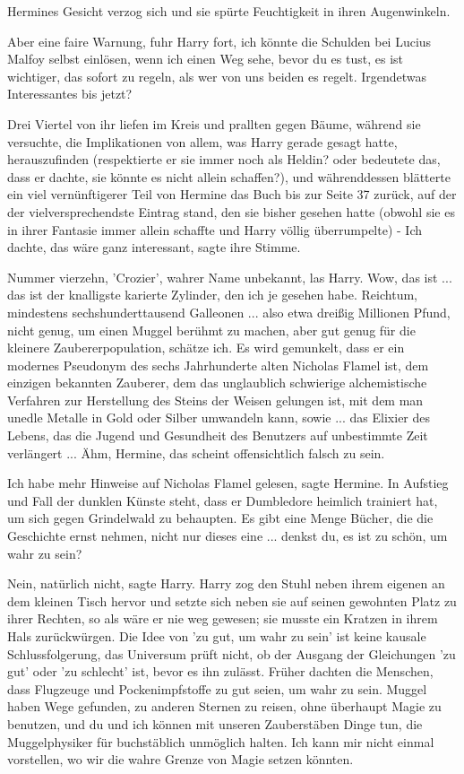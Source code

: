 Hermines Gesicht verzog sich und sie spürte Feuchtigkeit in ihren Augenwinkeln.

\glqq{}Aber eine faire Warnung\grqq{}, fuhr Harry fort, \glqq{}ich könnte die
Schulden bei Lucius Malfoy selbst einlösen, wenn ich einen Weg sehe, bevor du es
tust, es ist wichtiger, das sofort zu regeln, als wer von uns beiden es regelt.
Irgendetwas Interessantes bis jetzt?\grqq{}

Drei Viertel von ihr liefen im Kreis und prallten gegen Bäume, während sie
versuchte, die Implikationen von allem, was Harry gerade gesagt hatte,
herauszufinden (respektierte er sie immer noch als Heldin? oder bedeutete das,
dass er dachte, sie könnte es nicht allein schaffen?), und währenddessen
blätterte ein viel vernünftigerer Teil von Hermine das Buch bis zur Seite 37
zurück, auf der der vielversprechendste Eintrag stand, den sie bisher gesehen
hatte (obwohl sie es in ihrer Fantasie immer allein schaffte und Harry völlig
überrumpelte) - \glqq{}Ich dachte, das wäre ganz interessant\grqq{}, sagte ihre
Stimme.

\glqq{}Nummer vierzehn, 'Crozier', wahrer Name unbekannt\grqq{}, las Harry. \glqq{}
Wow, das ist ... das ist der knalligste karierte Zylinder, den ich je gesehen
habe. Reichtum, mindestens sechshunderttausend Galleonen ... also etwa dreißig
Millionen Pfund, nicht genug, um einen Muggel berühmt zu machen, aber gut genug
für die kleinere Zaubererpopulation, schätze ich. Es wird gemunkelt, dass er ein
modernes Pseudonym des sechs Jahrhunderte alten Nicholas Flamel ist, dem
einzigen bekannten Zauberer, dem das unglaublich schwierige alchemistische
Verfahren zur Herstellung des Steins der Weisen gelungen ist, mit dem man unedle
Metalle in Gold oder Silber umwandeln kann, sowie ... das Elixier des Lebens, das
die Jugend und Gesundheit des Benutzers auf unbestimmte Zeit verlängert ... Ähm,
Hermine, das scheint offensichtlich falsch zu sein.\grqq{}

\glqq{}Ich habe mehr Hinweise auf Nicholas Flamel gelesen\grqq{}, sagte Hermine.
\glqq{}In Aufstieg und Fall der dunklen Künste steht, dass er Dumbledore heimlich
trainiert hat, um sich gegen Grindelwald zu behaupten. Es gibt eine Menge
Bücher, die die Geschichte ernst nehmen, nicht nur dieses eine ... denkst du, es
ist zu schön, um wahr zu sein?\grqq{}

\glqq{}Nein, natürlich nicht\grqq{}, sagte Harry. Harry zog den Stuhl neben ihrem
eigenen an dem kleinen Tisch hervor und setzte sich neben sie auf seinen
gewohnten Platz zu ihrer Rechten, so als wäre er nie weg gewesen; sie musste ein
Kratzen in ihrem Hals zurückwürgen. \glqq{}Die Idee von 'zu gut, um wahr zu sein'
ist keine kausale Schlussfolgerung, das Universum prüft nicht, ob der Ausgang
der Gleichungen 'zu gut' oder 'zu schlecht' ist, bevor es ihn zulässt. Früher
dachten die Menschen, dass Flugzeuge und Pockenimpfstoffe zu gut seien, um wahr
zu sein. Muggel haben Wege gefunden, zu anderen Sternen zu reisen, ohne
überhaupt Magie zu benutzen, und du und ich können mit unseren Zauberstäben
Dinge tun, die Muggelphysiker für buchstäblich unmöglich halten. Ich kann mir
nicht einmal vorstellen, wo wir die wahre Grenze von Magie setzen
könnten.\grqq{}

